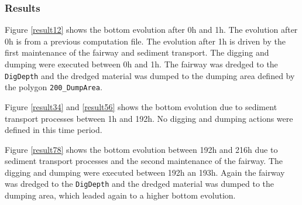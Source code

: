 \subsubsection{Results}
%
Figure \ref{result12} shows the bottom evolution after 0h and 1h. The evolution after 0h is from a previous computation file. The evolution after 1h  is driven by the first maintenance of the fairway and sediment transport. The digging and dumping were executed between 0h and 1h. The fairway was dredged to the \texttt{DigDepth} and the dredged material was dumped to the dumping area defined by the polygon \texttt{200\_DumpArea}.


 
Figure \ref{result34} and \ref{result56} shows the bottom evolution due to sediment transport processes between 1h and 192h. 
No digging and dumping actions were defined in this time period.

Figure \ref{result78} shows the bottom evolution between 192h and 216h due to sediment transport processes and the second maintenance of the fairway. The digging and dumping were executed between 192h an 193h. Again the fairway was dredged to the
\texttt{DigDepth} and the dredged material was dumped to the dumping area, which leaded again to a higher bottom evolution.

